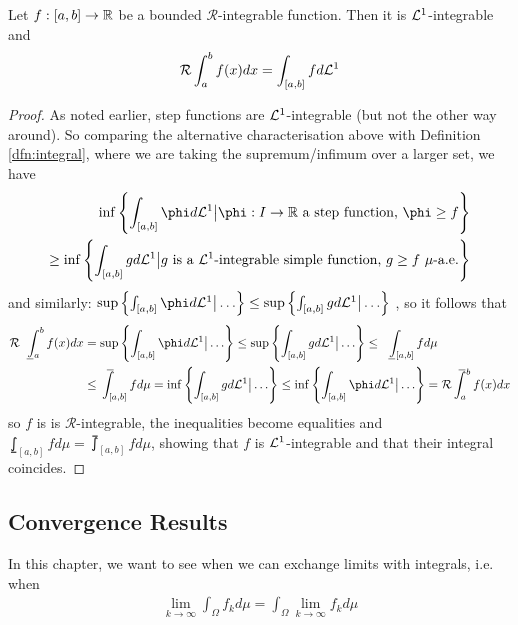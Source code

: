 \begin{prop}[]
  Let $f: [a,b] \to \mathbb{R}$ be a bounded $\mathcal{R}$-integrable function. Then it is $\mathcal{L}^{1}$-integrable and
  \begin{align*}
    \mathcal{R} \int_a^{b} f(x) dx = \int_{[a,b]}f d \mathcal{L}^{1}
  \end{align*}
\end{prop}
\begin{proof}
  As noted earlier, step functions are $\mathcal{L}^{1}$-integrable (but not the other way around).
  So comparing the alternative characterisation above with Definition \ref{dfn:integral}, where we are taking the supremum/infimum over a larger set, we have
  \begin{align*}
    \inf
    \left\{
      \int_{[a,b]} \phi d \Leb^{1} \big\vert \phi: I \to \R \text{ a step function, } \phi \geq f
    \right\}
    \\
    \geq
    \inf\left\{
      \int_{[a,b]} g d \Leb^{1} \big\vert g \text{ is a $\Leb^{1}$-integrable simple function, } g \geq f \text{ $\mu$-a.e.}
    \right\}
  \end{align*}
  and similarly:
  $
     \sup \left\{
       \int_{[a,b]} \phi d \Leb^{1}
       \big\vert \ldots
     \right\}
     \leq
     \sup \left\{
       \int_{[a,b]} g d \Leb^{1} \big\vert \ldots
     \right\}
  $
  , so it follows that
  \begin{align*}
    \mathcal{R} \lowint_{a}^{b} f(x) d x
    &=
    \sup \left\{
    \int_{[a,b]} \phi d \Leb^{1} \big\vert \ldots\right\}
    \leq 
    \sup
    \left\{\int_{[a,b]} g d \Leb^{1} \big\vert \ldots \right\}
    \leq 
    \lowint_{[a,b]} f d \mu
    \\
    &\leq
    \upint_{[a,b]} f d \mu
    =
    \inf \left\{\int_{[a,b]} g d \Leb^{1} \big\vert \ldots\right\}
    \leq
    \inf \left\{\int_{[a,b]} \phi d \Leb^{1} \big\vert \ldots \right\}
    = 
    \mathcal{R}
    \upint_{a}^{b} f(x) dx
  \end{align*}
  so $f$ is is $\mathcal{R}$-integrable, the inequalities become equalities and $\lowint_{[a,b]} f d \mu = \upint_{[a,b]} f d \mu$, showing that $f$ is $\mathcal{L}^{1}$-integrable and that their integral coincides.
\end{proof}


\subsection{Convergence Results}
In this chapter, we want to see when we can exchange limits with integrals, i.e. when 
\begin{align*}
  \lim_{k \to \infty} \int_{\Omega} f_k d \mu = \int_{\Omega} \lim_{k \to \infty} f_k d \mu
\end{align*}

